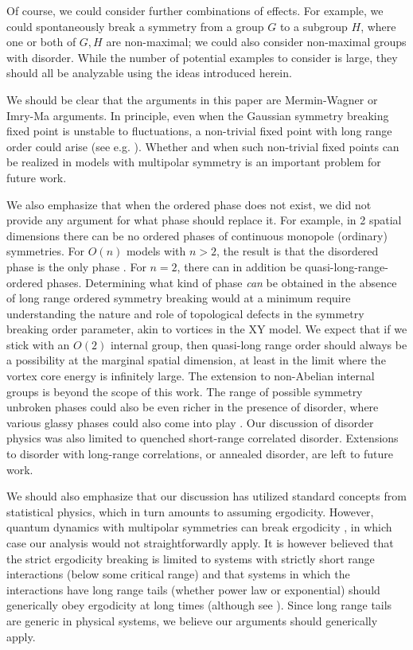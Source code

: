 \documentclass[prb,aps,twocolumn, amsfonts,amsmath,amssymb,nofootinbib,superscriptaddress]{revtex4-2}
\begin{document}
Of course, we could consider further combinations of effects. For example, we could spontaneously break a symmetry from a group $G$ to a subgroup $H$, where one or both of $G,H$ are non-maximal; we could also consider non-maximal groups with disorder. While the number of potential examples to consider is large, they should all be analyzable using the ideas introduced herein. 

We should be clear that the arguments in this paper are Mermin-Wagner or Imry-Ma arguments. 
In principle, even when the Gaussian symmetry breaking fixed point is unstable to fluctuations, a non-trivial fixed point with long range order could arise (see e.g. \cite{TonerRadzihovsky}). Whether and when such non-trivial fixed points can be realized in models with multipolar symmetry is an important problem for future work. 

We also emphasize that when the ordered phase does not exist, we did not provide any argument for what phase should replace it. For example, in 2 spatial dimensions there can be no ordered phases of continuous monopole (ordinary) symmetries. For $O(n)$ models with $n>2$, the result is that the disordered phase is the only phase \cite{polyakov}. For $n=2$, there can in addition be quasi-long-range-ordered phases. Determining what kind of phase {\it can} be obtained in the absence of long range ordered symmetry breaking would at a minimum require understanding the nature and role of topological defects in the symmetry breaking order parameter, akin to vortices in the XY model. We expect that if we stick with an $O(2)$ internal group, then quasi-long range order should always be a possibility at the marginal spatial dimension, at least in the limit where the vortex core energy is infinitely large. The extension to non-Abelian internal groups is beyond the scope of this work. 
The range of possible symmetry unbroken phases could also be even richer in the presence of disorder, where various glassy phases could also come into play \cite{Fisheretal}. Our discussion of disorder physics was also limited to quenched short-range correlated disorder. Extensions to disorder with long-range correlations, or annealed disorder, are left to future work.

We should also emphasize that our discussion has utilized standard concepts from statistical physics, which in turn amounts to assuming ergodicity. However, quantum dynamics with multipolar symmetries can break ergodicity \cite{KHN, Sala}, in which case our analysis would not straightforwardly apply. It is however believed that the strict ergodicity breaking is limited to systems with strictly short range interactions (below some critical range) and that systems in which the interactions have long range tails (whether power law or exponential) should generically obey ergodicity at long times (although see \cite{NS}). Since long range tails are generic in physical systems, we believe our arguments should generically apply.  
\end{document}
